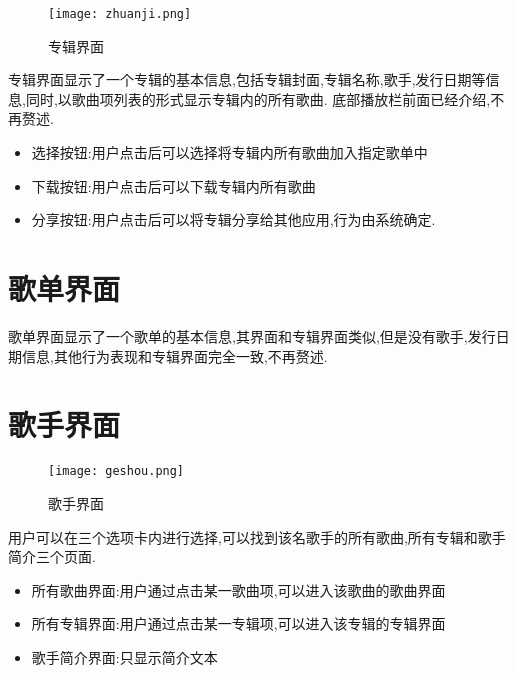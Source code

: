 \begin{figure}[H]
	\centering
	\texttt{[image: zhuanji.png]}
	\caption{专辑界面} 
	\label{fig:figure118}
\end{figure}

专辑界面显示了一个专辑的基本信息,包括专辑封面,专辑名称,歌手,发行日期等信息,同时,以歌曲项列表的形式显示专辑内的所有歌曲.
底部播放栏前面已经介绍,不再赘述.

\begin{itemize}
	\item 选择按钮:用户点击后可以选择将专辑内所有歌曲加入指定歌单中
	\item 下载按钮:用户点击后可以下载专辑内所有歌曲
	\item 分享按钮:用户点击后可以将专辑分享给其他应用,行为由系统确定.
\end{itemize}

\section{歌单界面}
歌单界面显示了一个歌单的基本信息,其界面和专辑界面类似,但是没有歌手,发行日期信息,其他行为表现和专辑界面完全一致,不再赘述.

\section{歌手界面}
\begin{figure}[H]
	\centering
	\texttt{[image: geshou.png]}
	\caption{歌手界面} 
	\label{fig:figure1v8}
\end{figure}

用户可以在三个选项卡内进行选择,可以找到该名歌手的所有歌曲,所有专辑和歌手简介三个页面.

\begin{itemize}
	\item 所有歌曲界面:用户通过点击某一歌曲项,可以进入该歌曲的歌曲界面
	\item 所有专辑界面:用户通过点击某一专辑项,可以进入该专辑的专辑界面
	\item 歌手简介界面:只显示简介文本
\end{itemize}

